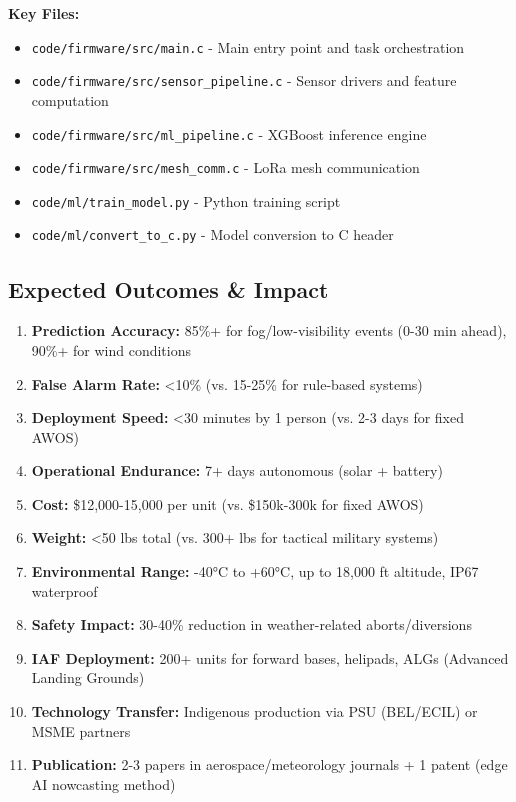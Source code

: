 \textbf{Key Files:}
\begin{itemize}
    \item \texttt{code/firmware/src/main.c} - Main entry point and task orchestration
    \item \texttt{code/firmware/src/sensor\_pipeline.c} - Sensor drivers and feature computation
    \item \texttt{code/firmware/src/ml\_pipeline.c} - XGBoost inference engine
    \item \texttt{code/firmware/src/mesh\_comm.c} - LoRa mesh communication
    \item \texttt{code/ml/train\_model.py} - Python training script
    \item \texttt{code/ml/convert\_to\_c.py} - Model conversion to C header
\end{itemize}

\subsection{Expected Outcomes \& Impact}

\begin{enumerate}[leftmargin=*]
    \item \textbf{Prediction Accuracy:} 85\%+ for fog/low-visibility events (0-30 min ahead), 90\%+ for wind conditions
    \item \textbf{False Alarm Rate:} <10\% (vs. 15-25\% for rule-based systems)
    \item \textbf{Deployment Speed:} <30 minutes by 1 person (vs. 2-3 days for fixed AWOS)
    \item \textbf{Operational Endurance:} 7+ days autonomous (solar + battery)
    \item \textbf{Cost:} \$12,000-15,000 per unit (vs. \$150k-300k for fixed AWOS)
    \item \textbf{Weight:} <50 lbs total (vs. 300+ lbs for tactical military systems)
    \item \textbf{Environmental Range:} -40°C to +60°C, up to 18,000 ft altitude, IP67 waterproof
    \item \textbf{Safety Impact:} 30-40\% reduction in weather-related aborts/diversions
    \item \textbf{IAF Deployment:} 200+ units for forward bases, helipads, ALGs (Advanced Landing Grounds)
    \item \textbf{Technology Transfer:} Indigenous production via PSU (BEL/ECIL) or MSME partners
    \item \textbf{Publication:} 2-3 papers in aerospace/meteorology journals + 1 patent (edge AI nowcasting method)
\end{enumerate}

